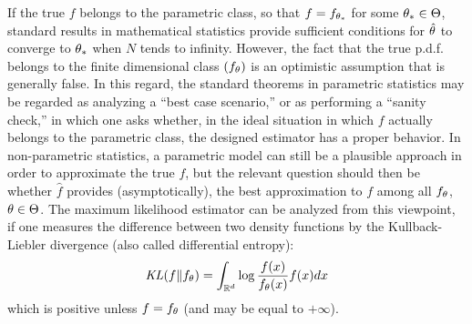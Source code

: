 If the true $f $ belongs to the parametric class, so that $f= f_{\theta_*}$ for some $\theta_*\in \Theta$, standard results in mathematical statistics \cite{bickel2015mathematical,lehmann2006theory} provide sufficient conditions for  ${\hat{\theta}}$ to converge to $\theta_*$ when $N$ tends to infinity.
However, the fact that the true p.d.f. belongs to the finite
dimensional class $(f_\theta)$ is an optimistic assumption that is generally false. In this regard, the standard theorems in parametric statistics may be regarded as analyzing  a ``best case scenario,'' or as performing a ``sanity check,'' in which one asks whether, in the ideal situation in which $f$ actually belongs to the parametric class, the designed estimator has a proper behavior. In non-parametric statistics, a  parametric model can still be a plausible approach in order to approximate the true $f$, but the relevant question should then be whether $\hat f$ provides (asymptotically), the best approximation to $f$ among all  $f_\theta$, $\theta\in \Theta$. The maximum likelihood estimator can be
analyzed from this viewpoint, if one measures the difference between two
density functions by the Kullback-Liebler divergence (also called differential entropy):
\begin{equation}
\label{eq:kl.pdf}
\mathit{KL}(f \| f_\theta) = \int_{{\mathbb{R}}^d} \log \frac{f(x)}{f_\theta(x)} f(x) dx
\end{equation}
which is positive unless $f=f_\theta$ (and may be equal to $+\infty$). 

